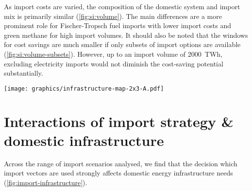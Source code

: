 \documentclass[5p,10pt]{elsarticle}
\begin{document}

As import costs are varied, the composition of the domestic system and import
mix is primarily similar (\cref{fig:si:volume}). The main differences are a
more prominent role for Fischer-Tropsch fuel imports with lower import costs and
green methane for high import volumes. It should also be noted that the windows
for cost savings are much smaller if only subsets of import options are
available (\cref{fig:si:volume-subsets}). However, up to an import volume of
2000~TWh, excluding electricity imports would not diminish the cost-saving
potential substantially.

\begin{figure*}
    \texttt{[image: graphics/infrastructure-map-2x3-A.pdf]}
    \caption{\textbf{Layout of European energy infrastructure for different import scenarios.}
        Left column shows the regional electricity supply mix (pies), added HVDC
        and HVAC transmission capacity (lines), and the siting of battery
        storage (choropleth). Right column shows the hydrogen supply (top half
        of pies) and consumption (bottom half of pies), net flow and direction
        of hydrogen in newly built pipelines (lines), and the siting of hydrogen
        storage subject to geological potentials (choropleth). Total volumes of
        transmission expansion are given in TWkm, which is the sum product of
        the capacity and length of individual connections. The half circle in
        the Bay of Biscay indicates the imports of carriers that are not
        spatially resolved: ammonia, steel, methanol, Fischer-Tropsch fuels.
        Hydrogen imports are shown at the entry points. Hydrogen imports in
        Bulgaria and Romania originate from Algeria and Egypt. Maps for more
        scenarios are included in the supplementary material. }
    \label{fig:import-infrastructure}
\end{figure*}

\section*{Interactions of import strategy \& domestic infrastructure}

Across the range of import scenarios analysed, we find that the decision which
import vectors are used strongly affects domestic energy infrastructure needs
(\cref{fig:import-infrastructure}).
\end{document}
